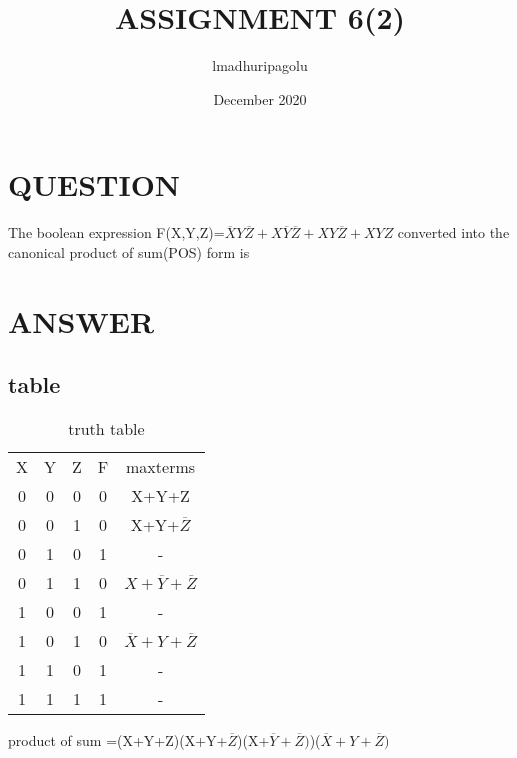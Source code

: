 \documentclass{article}
\title{ASSIGNMENT   6(2)}
\author{lmadhuripagolu }
\date{December 2020}
\begin{document}
\maketitle

\section{QUESTION}
The boolean expression F(X,Y,Z)=$\overline{X}Y\overline{Z}+X\overline{Y}\overline{Z}+XY\overline{Z}+XYZ$ converted into the canonical product of sum(POS) form is
\section{ANSWER}
\subsection{table}
\begin{table}[ht]
\begin{tabular}{|c|c|c|c|c|}
\hline
X & Y & Z & F & maxterms\\

0 & 0 & 0 & 0 & X+Y+Z \\

0 & 0 & 1 & 0 & X+Y+$\overline{Z}$\\

0 & 1 & 0 & 1 & -\\

0 & 1 & 1 & 0 & $X+\overline{Y}+\overline{Z}$ \\

1 & 0 & 0 & 1 & -\\

1 & 0 & 1 & 0 & $\overline{X}+Y+\overline{Z}$\\

1 & 1 & 0 & 1 & -\\

1 & 1 & 1 & 1 & -\\
\hline
\end{tabular}
    \caption{truth table}
    \label{tab:my_label}
\end{table}


product of sum =(X+Y+Z)(X+Y+$\overline{Z}$)(X+$\overline{Y}+\overline{Z})$)($\overline{X}+Y+\overline{Z})$
\end{document}
